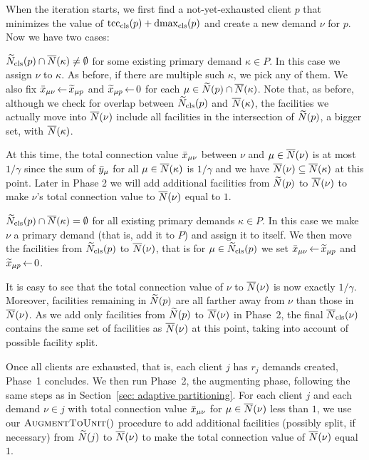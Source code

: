 When the iteration starts, we first find a not-yet-exhausted client
$p$ that minimizes the value of $\mbox{\rm{tcc}}_{{\mbox{\scriptsize\rm cls}}}(p) + \mbox{\rm{dmax}}_{{\mbox{\scriptsize\rm cls}}}(p)$ and create
a new demand $\nu$ for $p$.  Now we have two cases:
%
\begin{description}
%
\item{} ${\widetilde N}_{{\mbox{\scriptsize\rm cls}}}(p) \cap {\overline{N}}(\kappa)\neq\emptyset$
  for some existing primary demand $\kappa\in P$.  In this case we
  assign $\nu$ to $\kappa$. As before, if there are multiple such
  $\kappa$, we pick any of them. We also fix ${\bar x}_{\mu \nu} {\,\leftarrow\,}
  {\widetilde x}_{\mu p}$ and ${\widetilde x}_{\mu p}{\,\leftarrow\,} 0$ for each $\mu \in
  {\widetilde N}(p)\cap {\overline{N}}(\kappa)$. Note that, as before, although we
  check for overlap between ${\widetilde N}_{{\mbox{\scriptsize\rm cls}}}(p)$ and ${\overline{N}}(\kappa)$,
  the facilities we actually move into ${\overline{N}}(\nu)$ include all
  facilities in the intersection of ${\widetilde N}(p)$, a bigger set, with
  ${\overline{N}}(\kappa)$.

  At this time, the total connection value ${\bar x}_{\mu\nu}$ between
  $\nu$ and $\mu\in {\overline{N}}(\nu)$ is at most $1/\gamma$ since the sum
  of ${\bar y}_{\mu}$ for all $\mu \in {\overline{N}}(\kappa)$ is $1/\gamma$ and
  we have ${\overline{N}}(\nu) \subseteq {\overline{N}}(\kappa)$ at this point. Later
  in Phase 2 we will add additional facilities from ${\widetilde N}(p)$ to
  ${\overline{N}}(\nu)$ to make $\nu$'s total connection value to
  ${\overline{N}}(\nu)$ equal to $1$.

%
\item{} ${\widetilde N}_{{\mbox{\scriptsize\rm cls}}}(p) \cap {\overline{N}}(\kappa) = \emptyset$
  for all existing primary demands $\kappa\in P$.  In this case we
  make $\nu$ a primary demand (that is, add it to $P$) and assign it
  to itself.  We then move the facilities from ${\widetilde N}_{{\mbox{\scriptsize\rm cls}}}(p)$ to
  ${\overline{N}}(\nu)$, that is for $\mu \in {\widetilde N}_{{\mbox{\scriptsize\rm cls}}}(p)$ we set
  ${\bar x}_{\mu \nu}{\,\leftarrow\,} {\widetilde x}_{\mu p}$ and ${\widetilde x}_{\mu p}\,{\leftarrow}\,
  0$.

  It is easy to see that the total connection value of $\nu$ to
  ${\overline{N}}(\nu)$ is now exactly $1/\gamma$.  Moreover, facilities
  remaining in ${\widetilde N}(p)$ are all farther away from $\nu$ than
  those in ${\overline{N}}(\nu)$. As we add only facilities from ${\widetilde N}(p)$
  to ${\overline{N}}(\nu)$ in Phase~2, the final ${\overline{N}}_{{\mbox{\scriptsize\rm cls}}}(\nu)$ contains
  the same set of facilities as ${\overline{N}}(\nu)$ at this point, taking
  into account of possible facility split.
%
\end{description}
%
Once all clients are exhausted, that is, each client $j$ has $r_j$
demands created, Phase~1 concludes. We then run Phase~2, the
augmenting phase, following the same steps as in Section~\ref{sec:
  adaptive partitioning}.  For each client $j$ and each demand $\nu\in
j$ with total connection value ${\bar x}_{\mu\nu}$ for
$\mu\in{\overline{N}}(\nu)$ less than $1$, we use our ${\textsc{AugmentToUnit}}()$
procedure to add additional facilities (possibly split, if necessary)
from ${\widetilde N}(j)$ to ${\overline{N}}(\nu)$ to make the total connection value
of ${\overline{N}}(\nu)$ equal $1$.

